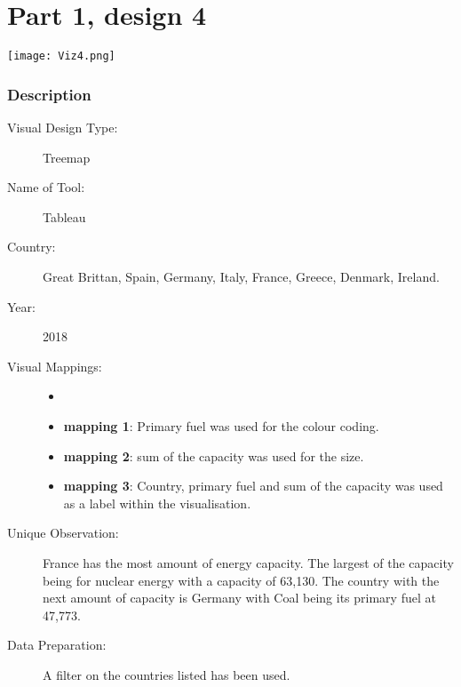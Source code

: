 \hypertarget{part-1-design-4}{%
\section{Part 1, design 4}\label{part-1-design-4}}

\centering
\texttt{[image: Viz4.png]}

\hypertarget{description}{%
\subsubsection{Description}\label{description}}

\begin{description}
\item[Visual Design Type:]
Treemap
\item[Name of Tool:]
Tableau
\item[Country:]
Great Brittan, Spain, Germany, Italy, France, Greece, Denmark, Ireland.
\item[Year:]
2018
\item[Visual Mappings:]
\begin{itemize}
	\tightlist
	\item[  ]
\end{itemize}

\begin{itemize}
\tightlist
\item
  \textbf{mapping 1}: Primary fuel was used for the colour coding.
\end{itemize}
\begin{itemize}
	\tightlist
	\item
	\textbf{mapping 2}: sum of the capacity was used for the size.
\end{itemize}
\begin{itemize}
\tightlist

\item
  \textbf{mapping 3}: Country, primary fuel and sum of the capacity was used as a label within the visualisation.
\end{itemize}
\item[Unique Observation:]
France has the most amount of energy capacity. The largest of the capacity being for nuclear energy with a capacity of 63,130. The country with the next amount of capacity is Germany with Coal being its primary fuel at 47,773.
\item[Data Preparation:]
A filter on the countries listed has been used.
\end{description}
 
